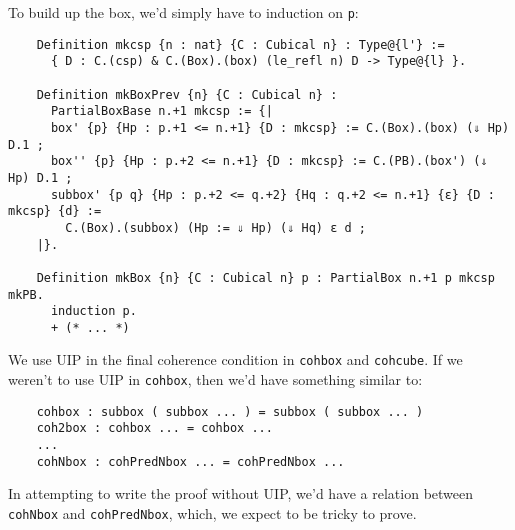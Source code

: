 \documentclass[10pt]{amsart}
\makeatletter
\theoremstyle{definition}
\def\subsection{\@startsection{subsection}{2}
  \z@{.5\linespacing\@plus.7\linespacing}{.6\baselineskip}{\centering}}
\numberwithin{definition}{subsection}
\numberwithin{definition}{section}
\def\subsection{\@startsection{subsection}{2}
  \z@{.5\linespacing\@plus.7\linespacing}{.6\baselineskip}{\centering}}
\makeatother
\begin{document}
To build up the box, we'd simply have to induction on \texttt{p}:

\begin{listing}[H]
  \begin{verbatim}
    Definition mkcsp {n : nat} {C : Cubical n} : Type@{l'} :=
      { D : C.(csp) & C.(Box).(box) (le_refl n) D -> Type@{l} }.

    Definition mkBoxPrev {n} {C : Cubical n} :
      PartialBoxBase n.+1 mkcsp := {|
      box' {p} {Hp : p.+1 <= n.+1} {D : mkcsp} := C.(Box).(box) (⇓ Hp) D.1 ;
      box'' {p} {Hp : p.+2 <= n.+1} {D : mkcsp} := C.(PB).(box') (⇓ Hp) D.1 ;
      subbox' {p q} {Hp : p.+2 <= q.+2} {Hq : q.+2 <= n.+1} {ε} {D : mkcsp} {d} :=
        C.(Box).(subbox) (Hp := ⇓ Hp) (⇓ Hq) ε d ;
    |}.

    Definition mkBox {n} {C : Cubical n} p : PartialBox n.+1 p mkcsp mkPB.
      induction p.
      + (* ... *)
  \end{verbatim}
\end{listing}

\subsection{UIP}
We use UIP in the final coherence condition in \texttt{cohbox} and \texttt{cohcube}. If we weren't to use UIP in \texttt{cohbox}, then we'd have something similar to:

\begin{listing}[H]
  \begin{verbatim}
    cohbox : subbox ( subbox ... ) = subbox ( subbox ... )
    coh2box : cohbox ... = cohbox ...
    ...
    cohNbox : cohPredNbox ... = cohPredNbox ...
  \end{verbatim}
\end{listing}

In attempting to write the proof without UIP, we'd have a relation between \texttt{cohNbox} and \texttt{cohPredNbox}, which, we expect to be tricky to prove.
\end{document}
